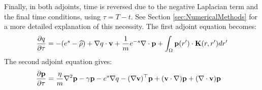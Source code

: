 Finally, in both adjoints, time is reversed due to the negative Laplacian term and the final time conditions, using $\tau = T-t$. See Section \ref{sec:NumericalMethods} for a more detailed explanation of this necessity.
The first adjoint equation becomes:
\begin{align*}
\frac{\partial q}{\partial \tau}  = - (e^s - \widehat {\rho})+ \nabla q \cdot \mathbf{v} +\frac{1}{m} e^{-s}\nabla \cdot \mathbf{p}  +  \int_\Omega  \mathbf{p}(r') \cdot\mathbf{K}(r,r')   dr' 
\end{align*}
The second adjoint equation gives:
\begin{align*}
&\frac{\partial \mathbf{p}}{\partial \tau} =   \frac{\eta}{m} \nabla^2 \mathbf{p}  - \gamma\mathbf{p}-e^s\nabla q -(\nabla \mathbf{v})^\top\mathbf{p} 
+ (\mathbf{v} \cdot \nabla)\mathbf{p} +  (\nabla \cdot \mathbf{v})\mathbf{p}  
\end{align*}